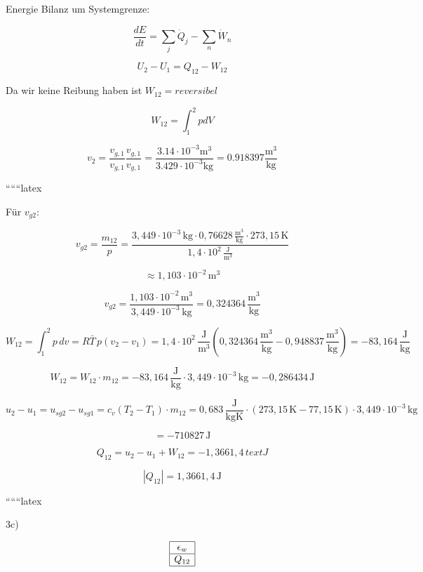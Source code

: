 Energie Bilanz um Systemgrenze:

\[
\frac{dE}{dt} = \sum_j \dot{Q}_j - \sum_n \dot{W}_n
\]

\[
U_2 - U_1 = Q_{12} - W_{12}
\]

Da wir keine Reibung haben ist $W_{12} = reversibel$

\[
W_{12} = \int_1^2 p dV
\]

\[
v_2 = \frac{v_{g,1}}{v_{g,1}} \frac{v_{g,1}}{v_{g,1}} = \frac{3.14 \cdot 10^{-3} \text{m}^3}{3.429 \cdot 10^{-3} \text{kg}} = 0.918397 \frac{\text{m}^3}{\text{kg}}
\]

``````latex


Für $v_{g2}$:

\[
v_{g2} = \frac{m_{12}}{p} = \frac{3{,}449 \cdot 10^{-3} \, \text{kg} \cdot 0{,}76628 \, \frac{\text{m}^3}{\text{kg}} \cdot 273{,}15 \, \text{K}}{1{,}4 \cdot 10^2 \, \frac{\text{J}}{\text{m}^3}}
\]

\[
\approx 1{,}103 \cdot 10^{-2} \, \text{m}^3
\]

\[
v_{g2} = \frac{1{,}103 \cdot 10^{-2} \, \text{m}^3}{3{,}449 \cdot 10^{-3} \, \text{kg}} = 0{,}324364 \, \frac{\text{m}^3}{\text{kg}}
\]

\[
W_{12} = \int_{1}^{2} p \, dv = R \bar{T} \, p (v_2 - v_1) = 1{,}4 \cdot 10^2 \, \frac{\text{J}}{\text{m}^3} \left( 0{,}324364 \, \frac{\text{m}^3}{\text{kg}} - 0{,}948837 \, \frac{\text{m}^3}{\text{kg}} \right) = -83{,}164 \, \frac{\text{J}}{\text{kg}}
\]

\[
W_{12} = W_{12} \cdot m_{12} = -83{,}164 \, \frac{\text{J}}{\text{kg}} \cdot 3{,}449 \cdot 10^{-3} \, \text{kg} = -0{,}286434 \, \text{J}
\]

\[
u_2 - u_1 = u_{sg2} - u_{sg1} = c_v (T_2 - T_1) \cdot m_{12} = 0{,}683 \, \frac{\text{J}}{\text{kgK}} \cdot (273{,}15 \, \text{K} - 77{,}15 \, \text{K}) \cdot 3{,}449 \cdot 10^{-3} \, \text{kg}
\]

\[
= -710827 \, \text{J}
\]

\[
Q_{12} = u_2 - u_1 + W_{12} = -1{,}3661{,}4 \,text{J}
\]

\[
|Q_{12}| = 1{,}3661{,}4 \, \text{J}
\]

``````latex


3c)

\[
\begin{array}{|c|}
\hline
\epsilon_w \\
\hline
Q_{12} \\
\hline
\end{array}
\]

